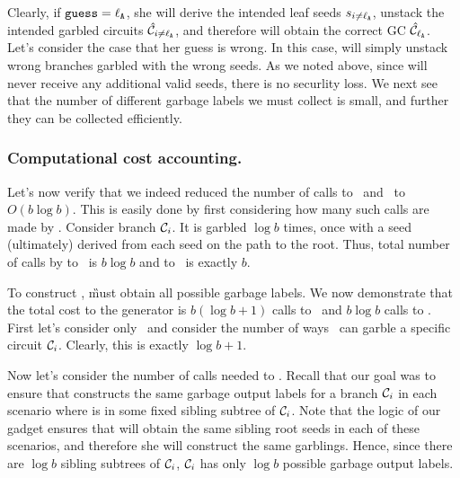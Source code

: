 Clearly, if $\mathtt{guess}=\mathtt{\ell_{A}}$, she will derive the intended leaf seeds $s_{i\neq\mathtt{\ell_{A}}}$, unstack the intended garbled circuits $\hat{\mathcal C}_{i\neq\mathtt{\ell_{A}}}$, and therefore will obtain the correct GC $\hat{\mathcal C}_\mathtt{\ell_{A}}$.   Let's consider the case that her guess is wrong. %
In this case, \E will simply unstack wrong branches garbled with the wrong seeds.  As we noted above, since \E will never receive any additional valid seeds, there is no securlity loss.  We next see that the number of different garbage labels we must collect is small, and further they can be collected efficiently.







\subsubsection{Computational cost accounting.} Let's now verify that we indeed reduced the number of calls to \Gb\ and \Ev\ to $O(b \log b)$.  This is easily done by first considering how many such calls are made by \E.  
Consider branch $\mathcal C_i$.  It is garbled $\log b$ times, once with a seed (ultimately) derived from each seed on the path to the root.  Thus, total number of calls by \E to \Gb\ is $b \log b$ and to \Ev\ is exactly $b$.  




To construct \gadget, \G must obtain all possible garbage labels. 
We now demonstrate that the total cost to the generator is $b (\log b + 1)$ calls to \Gb\ and $b \log b$ calls to \Ev.
First let’s consider only \Gb\ and consider the number of ways \E\ can garble a specific circuit $\mathcal C_i$. Clearly, this is exactly $\log b+1$.

Now let’s consider the number of calls needed to \Ev.
Recall that our goal was to ensure that \E constructs the same garbage output labels for a branch $\mathcal C_i$ in each scenario where \aid is in some fixed sibling subtree of $\mathcal C_i$. Note that the logic of our gadget ensures that \E will obtain the same sibling root seeds in each of these scenarios, and therefore she will construct the same garblings. Hence, since there are $\log b$ sibling subtrees of $\mathcal C_i$, $\mathcal C_i$ has only $\log b$ possible garbage output labels.



